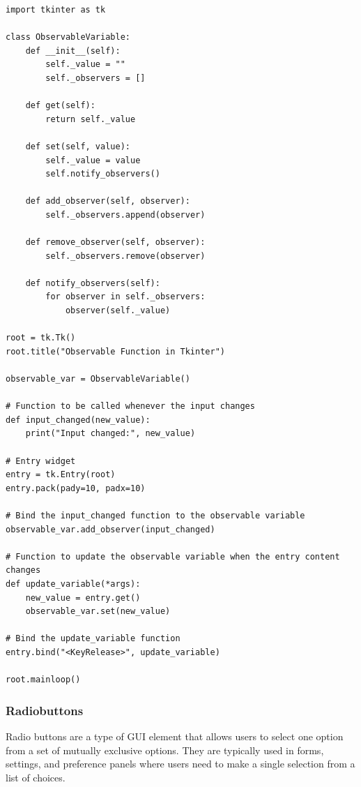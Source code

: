 \newpage
\begin{codebox}
\begin{verbatim}
import tkinter as tk

class ObservableVariable:
    def __init__(self):
        self._value = ""
        self._observers = []

    def get(self):
        return self._value

    def set(self, value):
        self._value = value
        self.notify_observers()

    def add_observer(self, observer):
        self._observers.append(observer)

    def remove_observer(self, observer):
        self._observers.remove(observer)

    def notify_observers(self):
        for observer in self._observers:
            observer(self._value)

root = tk.Tk()
root.title("Observable Function in Tkinter")

observable_var = ObservableVariable()

# Function to be called whenever the input changes
def input_changed(new_value):
    print("Input changed:", new_value)

# Entry widget
entry = tk.Entry(root)
entry.pack(pady=10, padx=10)

# Bind the input_changed function to the observable variable
observable_var.add_observer(input_changed)

# Function to update the observable variable when the entry content changes
def update_variable(*args):
    new_value = entry.get()
    observable_var.set(new_value)

# Bind the update_variable function
entry.bind("<KeyRelease>", update_variable)

root.mainloop()
\end{verbatim}
\end{codebox}

\newpage

\subsubsection{Radiobuttons}
Radio buttons are a type of GUI element that allows users to select one option from a set of mutually exclusive options. They are typically used in forms, settings, and preference panels where users need to make a single selection from a list of choices.

